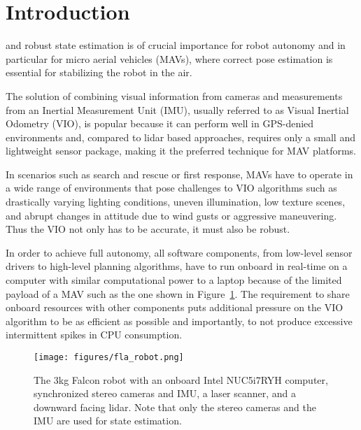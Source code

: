 \section{Introduction}
\label{sec: introduction}
 and robust state estimation is of crucial importance for robot autonomy and in particular for micro aerial vehicles (MAVs), where correct pose estimation is essential for stabilizing the robot in the air.

The solution of combining visual information from cameras and measurements from an Inertial Measurement Unit (IMU), usually referred to as Visual Inertial Odometry (VIO), is popular because it can perform well in GPS-denied environments and, compared to lidar based approaches, requires only a small and  lightweight sensor package, making it the preferred technique for MAV platforms.

In scenarios such as search and rescue or first response, MAVs have to operate in a wide range of environments that pose challenges to VIO algorithms such as drastically varying lighting conditions, uneven illumination, low texture scenes, and abrupt changes in attitude due to wind gusts or aggressive maneuvering. Thus the VIO not only has to be accurate, it must also be robust.

In order to achieve full autonomy, all software components, from low-level sensor drivers to high-level planning algorithms, have to run onboard in real-time on a computer with similar computational power to a laptop because of the limited payload of a MAV such as the one shown in Figure~\ref{fig: fla robot}. The requirement to share onboard resources with other components puts additional pressure on the VIO algorithm to be as efficient as possible and importantly, to not produce excessive intermittent spikes in CPU consumption.

\begin{figure}[tp]
\centering
\texttt{[image: figures/fla\_robot.png]}
\caption{The 3kg {\sc Falcon} robot with an onboard Intel NUC5i7RYH computer,  synchronized stereo cameras and IMU, a laser scanner, and a downward facing lidar. Note that only the stereo cameras and the IMU are used for state estimation.}
\label{fig: fla robot}
\end{figure}

